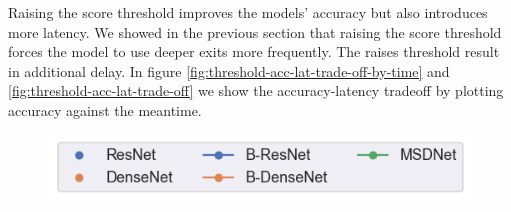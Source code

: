 Raising the score threshold improves the models' accuracy but also introduces more latency. We showed in the previous section that raising the score threshold forces the model to use deeper exits more frequently. The raises threshold result in additional delay. In figure \ref{fig:threshold-acc-lat-trade-off-by-time} and \ref{fig:threshold-acc-lat-trade-off} we show the accuracy-latency tradeoff by plotting accuracy against the meantime.
\begin{figure}
	\captionsetup[subfigure]{justification=centering,farskip=0pt,captionskip=0pt}
	\centering
	\includegraphics[width=.4\linewidth]{figures/threshold_plots/inference_by_time_legend}
	\hfill
	\hfill

\end{figure}

